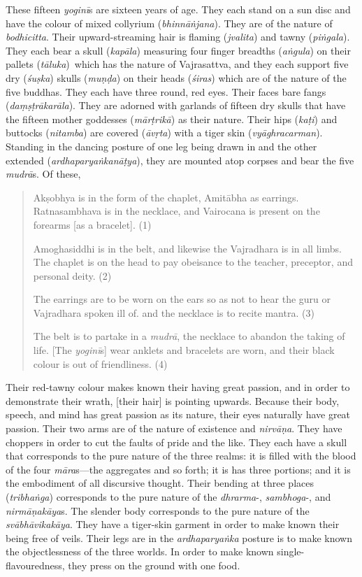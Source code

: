 \documentclass[naipra.tex]{subfiles}
\begin{document}
These fifteen \emph{yoginī}s are sixteen years of age.
They each stand on a sun disc and have the colour of mixed collyrium (\emph{bhinnāṅjana}).
They are of the nature of \emph{bodhicitta}.
Their upward-streaming hair is flaming (\emph{jvalita}) and tawny (\emph{piṅgala}).
They each bear a skull (\emph{kapāla}) measuring four finger breadths (\emph{aṅgula}) \crux on their pallets (\emph{tāluka})\crux\ which has the nature of Vajrasattva, and they each support five dry (\emph{śuṣka}) skulls (\emph{muṇḍa}) on their heads (\emph{śiras}) which are of the nature of the five buddhas.
They each have three round, red eyes.
Their faces bare fangs (\emph{daṃṣṭrākarāla}).
They are adorned with garlands of fifteen dry skulls that have the fifteen mother goddesses (\emph{mārṭrikā}) as their nature.
Their hips (\emph{kaṭi}) and buttocks (\emph{nitamba}) are covered (\emph{āvṛta}) with a tiger skin (\emph{vyāghracarman}).
Standing in the dancing posture of one leg being drawn in and the other extended (\emph{ardhaparyaṅkanāṭya}), they are mounted atop corpses and bear the five \emph{mudrā}s. 
Of these,

\begin{quote}
	Akṣobhya is in the form of the chaplet, Amitābha as earrings.
	Ratnasambhava is in the necklace, and Vairocana is present on the forearms [as a bracelet]. (1)
	
	Amoghasiddhi is in the belt, and likewise the Vajradhara is in all limbs.
	The chaplet is on the head to pay obeisance to the teacher, preceptor, and personal deity. (2)

	The earrings are to be worn on the ears so as not to hear the guru or Vajradhara spoken ill of. and the necklace is to recite mantra. (3)

	The belt is to partake in a \emph{mudrā}, the necklace to abandon the taking of life. 
	[The \emph{yoginī}s] wear anklets and bracelets are worn, and their black colour is out of friendliness. (4)
\end{quote}

Their red-tawny colour makes known their having great passion, and in order to demonstrate their wrath, [their hair] is pointing upwards.
Because their body, speech, and mind has great passion as its nature, their eyes naturally have great passion.
Their two arms are of the nature of existence and \emph{nirvāṇa}.
They have choppers in order to cut the faults of pride and the like.
They each have a skull that corresponds to the pure nature of the three realms: it is filled with the blood of the four \emph{māra}s—the aggregates and so forth; it is has three portions; and it is the embodiment of all discursive thought.
Their bending at three places (\emph{tribhaṅga}) corresponds to the pure nature of the \emph{dhrarma}-, \emph{sambhoga}-, and \emph{nirmāṇakāya}s.
The slender body corresponds to the pure nature of the \emph{svābhāvikakāya}.
They have a tiger-skin garment in order to make known their being free of veils.
Their legs are \crux in the \emph{ardhaparyaṅka} posture \crux is to make known the objectlessness of the three worlds.
In order to make known single-flavouredness, they press on the ground with one food.
\end{document}
